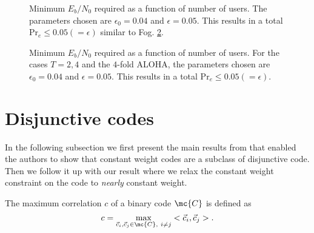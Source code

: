 \documentclass[final,onecolumn,12pt]{IEEEtran}
\def\Pr{\mathrm{Pr}}
\begin{document}
\begin{figure}[h]
\centering
 \resizebox{0.6\textwidth}{!}{}
  \caption{Minimum $E_b/N_0$ required as a function of number of users. The parameters chosen are $\epsilon_0=0.04$ and $\epsilon=0.05$.  This results in a total $\Pr_e\leq 0.05(=\epsilon)$ similar to Fog. \ref{fig:simulationresults30000}.}
  \label{fig:simulationresults_new}
\end{figure}


\begin{figure}[h]
\centering
 \resizebox{0.6\textwidth}{!}{}
  \caption{Minimum $E_b/N_0$ required as a function of number of users. For the cases $ T=2,4$ and the $4$-fold ALOHA, the parameters chosen are $\epsilon_0=0.04$ and $\epsilon=0.05$.  This results in a total $\Pr_e\leq 0.05(=\epsilon)$.}
  \label{fig:simulationresults30000}
\end{figure}






\appendix
\section{Disjunctive codes}
In the following subsection we first present the main results from \cite{fan1995superimposed} that enabled the authors to show that constant weight codes are a subclass of disjunctive code. Then we follow it up with our result where we relax the constant weight constraint on the code to \textit{nearly} constant weight.
\begin{definition}
The maximum correlation $c$ of a binary code $\mc{C}$ is defined as
\[
c=\max_{\vec{c}_i,\vec{c}_j\in \mc{C},~i\neq j} < \vec{c}_i,\vec{c}_j>.
\]
\end{definition}
\end{document}
